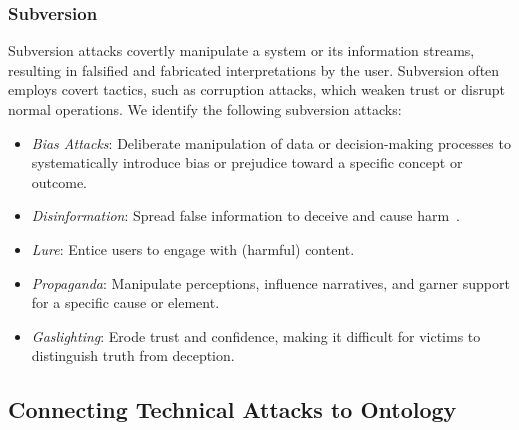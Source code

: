      \subsubsection{Subversion} 
     Subversion attacks covertly manipulate a system or its information streams, resulting in falsified and fabricated interpretations by the user. Subversion often employs covert tactics, such as corruption attacks, which weaken trust or disrupt normal operations. 
     We identify the following subversion attacks:
     \begin{itemize}
     \itemsep0em

     \item \emph{Bias Attacks}: Deliberate manipulation of data or decision-making processes to systematically introduce bias or prejudice toward a specific concept or outcome.
     \item \emph{Disinformation}: Spread false information to deceive and cause harm~\cite{guess2020misinformation}.
     \item  \emph{Lure}: Entice users to engage with (harmful) content.
     \item \emph{Propaganda}: Manipulate perceptions, influence narratives, and garner support for a specific cause or element.
     \item \emph{Gaslighting}: Erode trust and confidence, making it difficult for victims to distinguish truth from deception.
     \end{itemize}


\subsection{Connecting Technical Attacks to Ontology}

